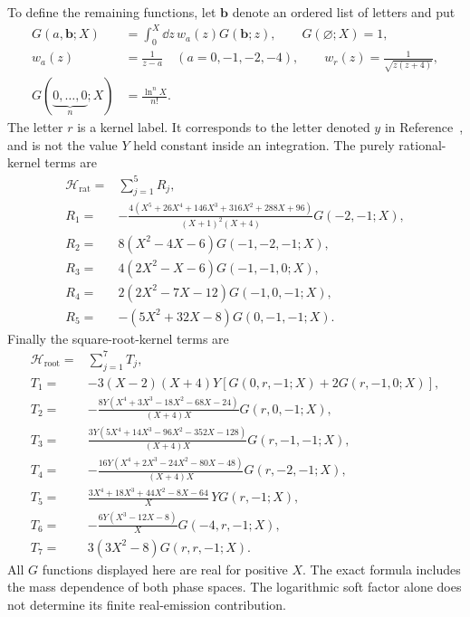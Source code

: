 To define the remaining functions, let $\bm b$ denote an ordered
list of letters and put
\begin{align}
 G(a,\bm b;X)&=\int_0^X\dd z\,w_a(z)G(\bm b;z),
 \qquad G(\varnothing;X)=1,\\
 w_a(z)&=\frac1{z-a}\quad(a=0,-1,-2,-4),\qquad
 w_{r}(z)=\frac1{\sqrt{z(z+4)}},\\
 G(\underbrace{0,\ldots,0}_{n};X)&=\frac{\ln^n X}{n!}.
\end{align}
The letter $r$ is a kernel label. It corresponds to the
letter denoted $y$ in Reference~\cite{qed-processes-lsz}, and is not
the value $Y$ held constant inside an integration.
The purely rational-kernel terms are
\begin{align}
 \mathcal H_{\mathrm{rat}}={}&\sum_{j=1}^{5}R_j,\\
 R_1={}&-\frac{4(X^5+26X^4+146X^3+316X^2+288X+96)}
                       {(X+1)^2(X+4)}G(-2,-1;X),\\
 R_2={}&8(X^2-4X-6)G(-1,-2,-1;X),\\
 R_3={}&4(2X^2-X-6)G(-1,-1,0;X),\\
 R_4={}&2(2X^2-7X-12)G(-1,0,-1;X),\\
 R_5={}&-(5X^2+32X-8)G(0,-1,-1;X).
\end{align}
Finally the square-root-kernel terms are
\begin{align}
 \mathcal H_{\mathrm{root}}={}&\sum_{j=1}^{7}T_j,\\
 T_1={}&-3(X-2)(X+4)Y
            [G(0,r,-1;X)+2G(r,-1,0;X)],\\
 T_2={}&-\frac{8Y(X^4+3X^3-18X^2-68X-24)}{(X+4)X}
                                     G(r,0,-1;X),\\
 T_3={}&\frac{3Y(5X^4+14X^3-96X^2-352X-128)}{(X+4)X}
                                     G(r,-1,-1;X),\\
 T_4={}&-\frac{16Y(X^4+2X^3-24X^2-80X-48)}{(X+4)X}
                                     G(r,-2,-1;X),\\
 T_5={}&\frac{3X^4+18X^3+44X^2-8X-64}{X}\,YG(r,-1;X),\\
 T_6={}&-\frac{6Y(X^3-12X-8)}{X}G(-4,r,-1;X),\\
 T_7={}&3(3X^2-8)G(r,r,-1;X).
\end{align}
All $G$ functions displayed here are real for positive $X$.
The exact formula includes the mass dependence of both phase
spaces. The logarithmic soft factor alone does not determine its finite
real-emission contribution.

